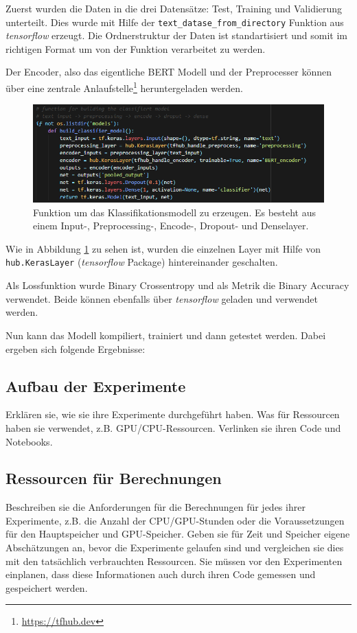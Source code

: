 \documentclass[DIV=13,fontsize=11pt]{scrartcl}
\begin{document}
Zuerst wurden die Daten in die drei Datensätze: Test, Training und Validierung unterteilt. Dies wurde mit Hilfe der
\texttt{text\_datase\_from\_directory} Funktion aus \textit{tensorflow} erzeugt. Die Ordnerstruktur der Daten ist standartisiert
und somit im richtigen Format um von der Funktion verarbeitet zu werden.

Der Encoder, also das eigentliche BERT Modell und der Preprocesser können über eine
zentrale Anlaufstelle\footnote{\url{https://tfhub.dev}} heruntergeladen werden.

\begin{figure}[H]
    \centering
    \includegraphics[width=\linewidth]{img/model_code.png}
    \caption{Funktion um das Klassifikationsmodell zu erzeugen. Es besteht aus einem Input-, Preprocessing-, Encode-, Dropout-
        und Denselayer.}
    \label{fig:model}
\end{figure}

Wie in Abbildung \ref{fig:model} zu sehen ist, wurden die einzelnen Layer mit Hilfe von \texttt{hub.KerasLayer}
(\textit{tensorflow} Package) hintereinander geschalten.

Als Lossfunktion wurde Binary Crossentropy und als Metrik die Binary Accuracy verwendet. Beide können ebenfalls über
\textit{tensorflow} geladen und verwendet werden.

Nun kann das Modell kompiliert, trainiert und dann getestet werden. Dabei ergeben sich folgende Ergebnisse:



\subsection{Aufbau der Experimente}
Erklären sie, wie sie ihre Experimente durchgeführt haben. Was für Ressourcen haben sie verwendet, z.B. GPU/CPU-Ressourcen.
Verlinken sie ihren Code und Notebooks.

\subsection{Ressourcen für Berechnungen}
Beschreiben sie die Anforderungen für die Berechnungen für jedes ihrer Experimente, z.B. die Anzahl der CPU/GPU-Stunden oder die Voraussetzungen für den Hauptspeicher und GPU-Speicher.
Geben sie für Zeit und Speicher eigene Abschätzungen an, bevor die Experimente gelaufen sind und vergleichen sie dies mit den tatsächlich verbrauchten Ressourcen.
Sie müssen vor den Experimenten einplanen, dass diese Informationen auch durch ihren Code gemessen und gespeichert werden.
\end{document}
